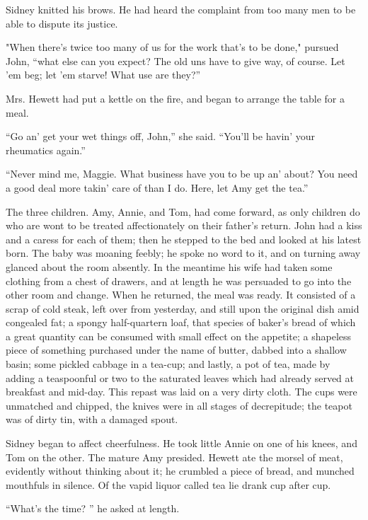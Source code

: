 Sidney knitted his brows. He had heard the complaint from too many men
to be able to dispute its justice.

"When there's twice too many of us for {\protect\hypertarget{48}{}{}}the
work that's to be done," pursued John, ``what else can you expect? The
old uns have to give way, of course. Let 'em beg; let 'em starve! What
use are they?''

Mrs. Hewett had put a kettle on the fire, and began to arrange the table
for a meal.

``Go an' get your wet things off, John,'' she said. ``You'll be havin'
your rheumatics again.''

``Never mind me, Maggie. What business have you to be up an' about? You
need a good deal more takin' care of than I do. Here, let Amy get the
tea.''

The three children. Amy, Annie, and Tom, had come forward, as only
children do who are wont to be treated affectionately on their father's
return. John had a kiss and a caress for each of them; then he stepped
to the bed and looked at his latest born. The baby was moaning feebly;
he spoke no word to it, and on turning away glanced about the room
absently. In the meantime his wife had taken some clothing from a chest
of drawers, and at length he was persuaded to
{\protect\hypertarget{49}{}{}}go into the other room and change. When he
returned, the meal was ready. It consisted of a scrap of cold steak,
left over from yesterday, and still upon the original dish amid
congealed fat; a spongy half-quartern loaf, that species of baker's
bread of which a great quantity can be consumed with small effect on the
appetite; a shapeless piece of something purchased under the name of
butter, dabbed into a shallow basin; some pickled cabbage in a tea-cup;
and lastly, a pot of tea, made by adding a teaspoonful or two to the
saturated leaves which had already served at breakfast and mid-day. This
repast was laid on a very dirty cloth. The cups were unmatched and
chipped, the knives were in all stages of decrepitude; the teapot was of
dirty tin, with a damaged spout.

Sidney began to affect cheerfulness. He took little Annie on one of his
knees, and Tom on the other. The mature Amy presided. Hewett ate the
morsel of meat, evidently without thinking about it; he crumbled a piece
of bread, and munched mouthfuls in
{\protect\hypertarget{50}{}{}}silence. Of the vapid liquor called tea
lie drank cup after cup.

``What's the time? '' he asked at length.

